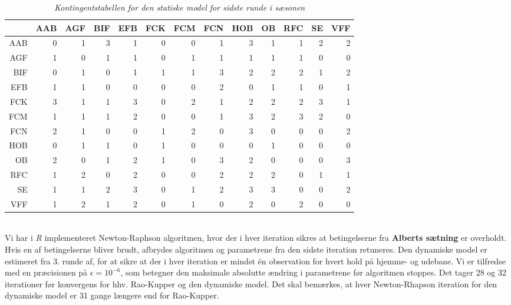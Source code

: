 \documentclass[11pt,a4paper]{article}
\begin{document}
\begin{table}[ht]
\centering
\begin{adjustbox}{max width=\textwidth}
\begin{tabular}{|rrrrrrrrrrrrr|}
  \hline
 & AAB & AGF & BIF & EFB & FCK & FCM & FCN & HOB & OB & RFC & SE & VFF \\ 
  \hline
AAB &   0 &   1 &   3 &   1 &   0 &   0 &   1 &   3 &   1 &   1 &   2 &   2 \\ 
  AGF &   1 &   0 &   1 &   1 &   0 &   1 &   1 &   1 &   1 &   1 &   0 &   0 \\ 
  BIF &   0 &   1 &   0 &   1 &   1 &   1 &   3 &   2 &   2 &   2 &   1 &   2 \\ 
  EFB &   1 &   1 &   0 &   0 &   0 &   0 &   2 &   0 &   1 &   1 &   0 &   1 \\ 
  FCK &   3 &   1 &   1 &   3 &   0 &   2 &   1 &   2 &   2 &   2 &   3 &   1 \\ 
  FCM &   1 &   1 &   1 &   2 &   0 &   0 &   1 &   3 &   2 &   3 &   2 &   0 \\ 
  FCN &   2 &   1 &   0 &   0 &   1 &   2 &   0 &   3 &   0 &   0 &   0 &   2 \\ 
  HOB &   0 &   1 &   1 &   0 &   1 &   0 &   0 &   0 &   1 &   0 &   0 &   0 \\ 
  OB &   2 &   0 &   1 &   2 &   1 &   0 &   3 &   2 &   0 &   0 &   0 &   3 \\ 
  RFC &   1 &   2 &   0 &   2 &   0 &   0 &   2 &   2 &   2 &   0 &   1 &   1 \\ 
  SE &   1 &   1 &   2 &   3 &   0 &   1 &   2 &   3 &   3 &   0 &   0 &   2 \\ 
  VFF &   1 &   2 &   1 &   2 &   0 &   1 &   0 &   2 &   0 &   2 &   0 &   0 \\ 
   \hline
\end{tabular}
\end{adjustbox}
\caption{\label{tab:Kontingentstabel}\textit{Kontingentstabellen for den statiske model for sidste runde i sæsonen}}
\end{table}
\\Vi har i \textit{R} implementeret Newton-Raphson algoritmen, hvor der i hver iteration sikres at betingelserne fra \textbf{Alberts sætning} er overholdt. Hvis en af betingelserne bliver brudt, afbrydes algoritmen og parametrene fra den sidste iteration retuneres. Den dynamiske model er estimeret fra 3. runde af, for at sikre at der i hver iteration er mindst én observation for hvert hold på hjemme- og udebane. Vi er tilfredse med en præcisionen på $\epsilon = 10^{-6}$, som betegner den maksimale absolutte ændring i parametrene før algoritmen stoppes. Det tager 28 og 32 iterationer før konvergens for hhv. Rao-Kupper og den dynamiske model. Det  skal bemærkes, at hver Newton-Rhapson iteration for den dynamiske model er 31 gange længere end for Rao-Kupper. 
\end{document}
